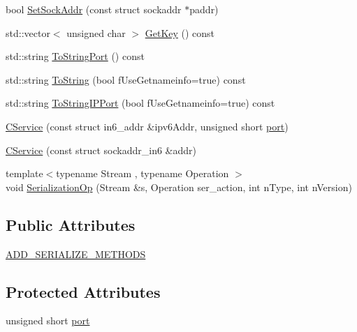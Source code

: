 \begin{DoxyCompactItemize}
\item 
bool \mbox{\hyperlink{class_c_service_a77782219f5d85f326b4c089cb2636e6f}{Set\+Sock\+Addr}} (const struct sockaddr $\ast$paddr)
\item 
std\+::vector$<$ unsigned char $>$ \mbox{\hyperlink{class_c_service_af21ea7db4318330b337c8bfdcc55aff0}{Get\+Key}} () const
\item 
std\+::string \mbox{\hyperlink{class_c_service_a95d6f24b6a613fca24734ba4e38ef3dc}{To\+String\+Port}} () const
\item 
std\+::string \mbox{\hyperlink{class_c_service_ae274e8b6fc38955d74044d326a405024}{To\+String}} (bool f\+Use\+Getnameinfo=true) const
\item 
std\+::string \mbox{\hyperlink{class_c_service_a75b6c84b3184ab809b6dda3576be78ee}{To\+String\+I\+P\+Port}} (bool f\+Use\+Getnameinfo=true) const
\item 
\mbox{\hyperlink{class_c_service_a92fd246e176f01266cb36beae0c8f4fe}{C\+Service}} (const struct in6\+\_\+addr \&ipv6\+Addr, unsigned short \mbox{\hyperlink{class_c_service_aef17734203dc2125cbdf4d23e50be410}{port}})
\item 
\mbox{\hyperlink{class_c_service_ac0eb3107507be78cc683e7a7fa8d56e4}{C\+Service}} (const struct sockaddr\+\_\+in6 \&addr)
\item 
{\footnotesize template$<$typename Stream , typename Operation $>$ }\\void \mbox{\hyperlink{class_c_service_a0673ebec7bdc8558ce3fe1d63ea4d2e1}{Serialization\+Op}} (Stream \&s, Operation ser\+\_\+action, int n\+Type, int n\+Version)
\end{DoxyCompactItemize}
\subsection*{Public Attributes}
\begin{DoxyCompactItemize}
\item 
\mbox{\hyperlink{class_c_service_a3347aa84bd8f98ae853307ad4e47a4f5}{A\+D\+D\+\_\+\+S\+E\+R\+I\+A\+L\+I\+Z\+E\+\_\+\+M\+E\+T\+H\+O\+DS}}
\end{DoxyCompactItemize}
\subsection*{Protected Attributes}
\begin{DoxyCompactItemize}
\item 
unsigned short \mbox{\hyperlink{class_c_service_aef17734203dc2125cbdf4d23e50be410}{port}}
\end{DoxyCompactItemize}
